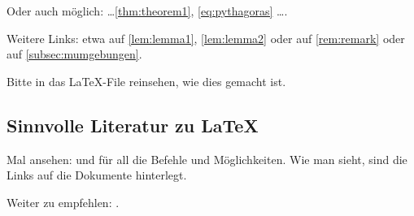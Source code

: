 Oder auch möglich: \ldots \cref{thm:theorem1}, \vref{eq:pythagoras} \ldots.

Weitere Links: etwa auf \vref{lem:lemma1}, \vref{lem:lemma2} oder auf \vref{rem:remark} oder auf \vref{subsec:mumgebungen}.

Bitte in das \LaTeX-File reinsehen, wie dies gemacht ist.
%
\subsection{Sinnvolle Literatur zu \LaTeX}
%
Mal ansehen: \textcite{l2tabu} und \textcite{lshort-german} \bzw \textcite{latex-refsheet} für all die Befehle und Möglichkeiten.
Wie man sieht, sind die Links auf die Dokumente hinterlegt.

Weiter zu empfehlen: \textcite{graetzer:2007}.


